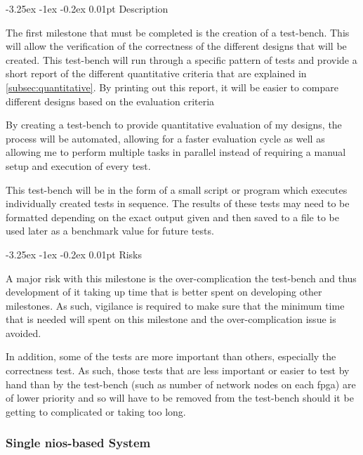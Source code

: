 \documentclass[paper=a4, fontsize=11pt, bibliography=totocnumbered]{scrartcl}
\makeatletter
\renewcommand\paragraph{\@startsection{paragraph}{4}{\z@}%
  {-3.25ex \@plus -1ex \@minus -0.2ex}%
  {0.01pt}%
  {\raggedsection\normalfont\sectfont\nobreak\size@paragraph}%
}
\numberwithin{equation}{section}		%
\numberwithin{figure}{section}			%
\numberwithin{table}{section}				%
\makeatother
\begin{document}
\paragraph{Description}

The first milestone that must be completed is the creation of a test-bench. This will allow the verification of the correctness of the different designs that will be created. This test-bench will run through a specific pattern of tests and provide a short report of the different quantitative criteria that are explained in \cref{subsec:quantitative}. By printing out this report, it will be easier to compare different designs based on the evaluation criteria 

By creating a test-bench to provide quantitative evaluation of my designs, the process will be automated, allowing for a faster evaluation cycle as well as allowing me to perform multiple tasks in parallel instead of requiring a manual setup and execution of every test.

This test-bench will be in the form of a small script or program which executes individually created tests in sequence. The results of these tests may need to be formatted depending on the exact output given and then saved to a file to be used later as a benchmark value for future tests.

\paragraph{Risks}

A major risk with this milestone is the over-complication the test-bench and thus development of it taking up time that is better spent on developing other milestones. As such, vigilance is required to make sure that the minimum time that is needed will spent on this milestone and the over-complication issue is avoided.

In addition, some of the tests are more important than others, especially the correctness test. As such, those tests that are less important or easier to test by hand than by the test-bench (such as number of \glspl{network node} on each \gls{fpga}) are of lower priority and so will have to be removed from the test-bench should it be getting to complicated or taking too long.

\subsubsection{Single \gls{nios}-based  System}
\end{document}

